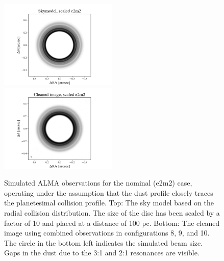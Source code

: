 \begin{figure}
\begin{center}
    \includegraphics[width=0.5\textwidth]{figures/grind/skymodel_e2m2.png}
    \includegraphics[width=0.5\textwidth]{figures/grind/xy_e2m2.png}
    \caption{Simulated ALMA observations for the nominal (e2m2) case, operating under the assumption that the dust profile 
    closely traces the planetesimal collision profile.  Top: The sky model based on the radial collision distribution. The size of the 
    disc has been scaled by a factor of 10 and placed at  a distance of 100 pc. Bottom: The cleaned image using combined 
    observations in configurations 8, 9, and 10. The circle in the bottom left indicates the simulated beam size. Gaps in the dust 
    due to the 3:1 and 2:1 resonances are visible. 
    \label{fig:alma_sim_obs}}
\end{center}
\end{figure}

